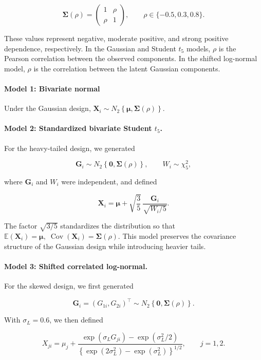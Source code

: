 \documentclass[11pt]{article}
\theoremstyle{remark}
\newcommand{\E}{\mathbb{E}}
\begin{document}
$$
\boldsymbol{\Sigma}(\rho)
=
\begin{pmatrix}
1 & \rho\\
\rho & 1
\end{pmatrix},
\qquad
\rho\in\{-0.5,0.3,0.8\}.
$$

These values represent negative, moderate positive, and strong positive dependence, respectively. In the Gaussian and Student $t_5$ models, $\rho$ is the Pearson correlation between the observed components. In the shifted log-normal model, $\rho$ is the correlation between the latent Gaussian components.

\paragraph{Model 1: Bivariate normal} 
Under the Gaussian design, $
\boldsymbol{X}_i
\sim
N_2\!\left\{
\boldsymbol{\mu},
\boldsymbol{\Sigma}(\rho)
\right\}.
$


\paragraph{Model 2: Standardized bivariate Student $t_5$.}
For the heavy-tailed design, we generated

$$
\boldsymbol{G}_i
\sim
N_2\!\left\{
\boldsymbol{0},
\boldsymbol{\Sigma}(\rho)
\right\},
\qquad
W_i\sim\chi^2_5,
$$

where $\boldsymbol{G}_i$ and $W_i$ were independent, and defined

$$
\boldsymbol{X}_i
=
\boldsymbol{\mu}
+
\sqrt{\frac{3}{5}}\,
\frac{\boldsymbol{G}_i}{\sqrt{W_i/5}}.
$$

The factor $\sqrt{3/5}$ standardizes the distribution so that
$
\E(\boldsymbol{X}_i)=\boldsymbol{\mu},
\;
\operatorname{Cov}(\boldsymbol{X}_i)
=
\boldsymbol{\Sigma}(\rho).
$
This model preserves the covariance structure of the Gaussian design while introducing heavier tails.

\paragraph{Model 3: Shifted correlated log-normal.}
For the skewed design, we first generated

$$
\boldsymbol{G}_i
=
(G_{1i},G_{2i})^\top
\sim
N_2\!\left\{
\boldsymbol{0},
\boldsymbol{\Sigma}(\rho)
\right\}.
$$

With $\sigma_L=0.6$, we then defined

$$
X_{ji}
=
\mu_j
+
\frac{
\exp(\sigma_LG_{ji})-\exp(\sigma_L^2/2)
}{
\left\{
\exp(2\sigma_L^2)-\exp(\sigma_L^2)
\right\}^{1/2}
},
\qquad
j=1,2.
$$
\end{document}

